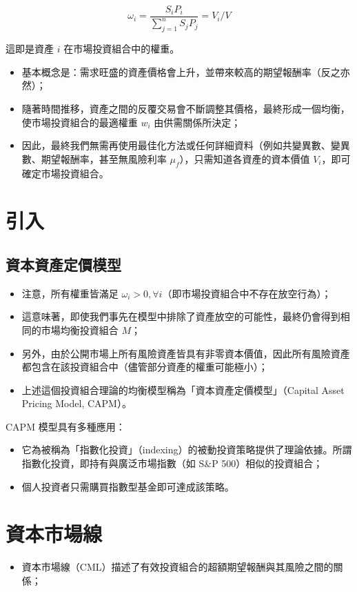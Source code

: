 \documentclass[letterpaper]{article}
\begin{document}
$$
\omega_{i}=\frac{S_{i} P_{i}}{\sum_{j=1}^{n} S_{j} P_{j}}=V_{i} / V
$$

這即是資產 $i$ 在市場投資組合中的權重。

\begin{itemize}
	\item 基本概念是：需求旺盛的資產價格會上升，並帶來較高的期望報酬率（反之亦然）；
	\item 隨著時間推移，資產之間的反覆交易會不斷調整其價格，最終形成一個均衡，使市場投資組合的最適權重 $w_{i}$ 由供需關係所決定；
	\item 因此，最終我們無需再使用最佳化方法或任何詳細資料（例如共變異數、變異數、期望報酬率，甚至無風險利率 $\mu_{f}$），只需知道各資產的資本價值 $V_{i}$，即可確定市場投資組合。
\end{itemize}


\section{引入}
\subsection{資本資產定價模型}
\begin{itemize}
	\item 注意，所有權重皆滿足 $\omega_{i} > 0, \forall i$（即市場投資組合中不存在放空行為）；
	\item 這意味著，即使我們事先在模型中排除了資產放空的可能性，最終仍會得到相同的市場均衡投資組合 $M$；
	\item 另外，由於公開市場上所有風險資產皆具有非零資本價值，因此所有風險資產都包含在該投資組合中（儘管部分資產的權重可能極小）；
	\item 上述這個投資組合理論的均衡模型稱為「資本資產定價模型」（Capital Asset Pricing Model, CAPM）。
\end{itemize}

CAPM 模型具有多種應用：

\begin{itemize}
	\item 它為被稱為「指數化投資」（indexing）的被動投資策略提供了理論依據。所謂指數化投資，即持有與廣泛市場指數（如 S\&P 500）相似的投資組合；
	\item 個人投資者只需購買指數型基金即可達成該策略。
\end{itemize}

\section{資本市場線}
\begin{itemize}
	\item 資本市場線（CML）描述了有效投資組合的超額期望報酬與其風險之間的關係；
\end{itemize}
\end{document}
